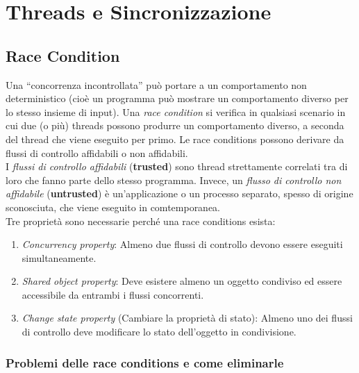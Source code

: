 \chapter{Threads e Sincronizzazione}

\section{Race Condition}

Una “concorrenza incontrollata” può portare a un comportamento non deterministico
(cioè un programma può mostrare un comportamento diverso per lo stesso insieme
di input).
Una \textit{race condition} si verifica in qualsiasi scenario in cui due (o più)
threads possono
produrre un comportamento diverso, a seconda del thread che viene eseguito per primo.
Le race conditions possono derivare da flussi di controllo affidabili o non
affidabili.\\
I \textit{flussi di controllo affidabili} (\textbf{trusted}) sono thread
strettamente correlati tra di loro che fanno parte dello stesso programma.
Invece, un \textit{flusso di controllo non affidabile} (\textbf{untrusted})
è un'applicazione o un processo separato, spesso di origine sconosciuta,
che viene eseguito in comtemporanea.\\

Tre proprietà sono necessarie perché una race conditions esista:
\begin{enumerate}
    \item \textit{Concurrency property}: Almeno due flussi di controllo
          devono essere eseguiti simultaneamente.
    \item \textit{Shared object property}: Deve esistere almeno un oggetto
          condiviso ed
          essere accessibile da
          entrambi i flussi concorrenti.
    \item \textit{Change state property} (Cambiare la proprietà di stato):
          Almeno uno dei flussi di
          controllo deve modificare lo stato dell'oggetto in condivisione.
\end{enumerate}

\subsection{Problemi delle race conditions e come eliminarle}

